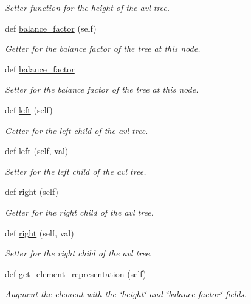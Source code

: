 \begin{DoxyCompactItemize}
\begin{DoxyCompactList}\small\item\em Setter function for the height of the avl tree. \end{DoxyCompactList}\item 
def \mbox{\hyperlink{classbridges_1_1avl__tree__element_1_1_a_v_l_tree_element_a44085ad5195b41ab0f552db065e43c9d}{balance\+\_\+factor}} (self)
\begin{DoxyCompactList}\small\item\em Getter for the balance factor of the tree at this node. \end{DoxyCompactList}\item 
def \mbox{\hyperlink{classbridges_1_1avl__tree__element_1_1_a_v_l_tree_element_abc448bdf8e9e494e148a8b70dbd02cbf}{balance\+\_\+factor}}
\begin{DoxyCompactList}\small\item\em Setter for the balance factor of the tree at this node. \end{DoxyCompactList}\item 
def \mbox{\hyperlink{classbridges_1_1avl__tree__element_1_1_a_v_l_tree_element_a717696b26736f5c9585fefc7c5ab88f1}{left}} (self)
\begin{DoxyCompactList}\small\item\em Getter for the left child of the avl tree. \end{DoxyCompactList}\item 
def \mbox{\hyperlink{classbridges_1_1avl__tree__element_1_1_a_v_l_tree_element_aa60894585b83e7cb526d8c10eca75a59}{left}} (self, val)
\begin{DoxyCompactList}\small\item\em Setter for the left child of the avl tree. \end{DoxyCompactList}\item 
def \mbox{\hyperlink{classbridges_1_1avl__tree__element_1_1_a_v_l_tree_element_aaab3b79617e7e503b1a7c28069d1eb15}{right}} (self)
\begin{DoxyCompactList}\small\item\em Getter for the right child of the avl tree. \end{DoxyCompactList}\item 
def \mbox{\hyperlink{classbridges_1_1avl__tree__element_1_1_a_v_l_tree_element_ad9b5962ea5c89c9b91d7767b1b258c8e}{right}} (self, val)
\begin{DoxyCompactList}\small\item\em Setter for the right child of the avl tree. \end{DoxyCompactList}\item 
def \mbox{\hyperlink{classbridges_1_1avl__tree__element_1_1_a_v_l_tree_element_a9c5d7ae75ec92d6ff208b56ebba710ca}{get\+\_\+element\+\_\+representation}} (self)
\begin{DoxyCompactList}\small\item\em Augment the element with the \char`\"{}height\char`\"{} and \char`\"{}balance factor\char`\"{} fields. \end{DoxyCompactList}\end{DoxyCompactItemize}
